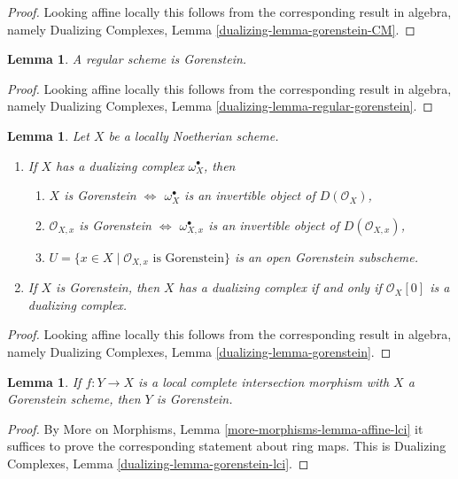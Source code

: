 \documentclass{stacks-project}
\theoremstyle{plain}
\newtheorem{lemma}[subsection]{Lemma}
\theoremstyle{definition}
\theoremstyle{remark}
\numberwithin{equation}{subsection}
\begin{document}
\begin{proof}
Looking affine locally this follows from the corresponding
result in algebra, namely
Dualizing Complexes, Lemma \ref{dualizing-lemma-gorenstein-CM}.
\end{proof}

\begin{lemma}
\label{lemma-regular-gorenstein}
A regular scheme is Gorenstein.
\end{lemma}

\begin{proof}
Looking affine locally this follows from the corresponding
result in algebra, namely
Dualizing Complexes, Lemma \ref{dualizing-lemma-regular-gorenstein}.
\end{proof}

\begin{lemma}
\label{lemma-gorenstein}
Let $X$ be a locally Noetherian scheme.
\begin{enumerate}
\item If $X$ has a dualizing complex $\omega_X^\bullet$, then
\begin{enumerate}
\item $X$ is Gorenstein $\Leftrightarrow$ $\omega_X^\bullet$ is an invertible
object of $D(\mathcal{O}_X)$,
\item $\mathcal{O}_{X, x}$ is Gorenstein $\Leftrightarrow$
$\omega_{X, x}^\bullet$ is an invertible object of $D(\mathcal{O}_{X, x})$,
\item $U = \{x \in X \mid \mathcal{O}_{X, x}\text{ is Gorenstein}\}$
is an open Gorenstein subscheme.
\end{enumerate}
\item If $X$ is Gorenstein, then $X$ has a dualizing complex if and
only if $\mathcal{O}_X[0]$ is a dualizing complex.
\end{enumerate}
\end{lemma}

\begin{proof}
Looking affine locally this follows from the corresponding
result in algebra, namely
Dualizing Complexes, Lemma \ref{dualizing-lemma-gorenstein}.
\end{proof}

\begin{lemma}
\label{lemma-gorenstein-lci}
If $f : Y \to X$ is a local complete intersection morphism
with $X$ a Gorenstein scheme, then $Y$ is Gorenstein.
\end{lemma}

\begin{proof}
By More on Morphisms, Lemma \ref{more-morphisms-lemma-affine-lci}
it suffices to prove the corresponding statement about ring maps.
This is Dualizing Complexes, Lemma \ref{dualizing-lemma-gorenstein-lci}.
\end{proof}
\end{document}
